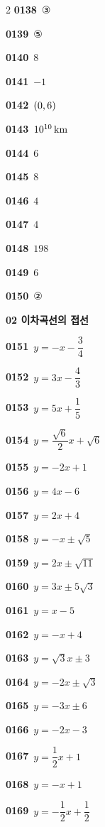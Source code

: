 \documentclass[10pt,a4paper]{article}
\begin{document}
\begin{multicols}{2}
\noindent\textbf{0138}\ ③\par
\noindent\textbf{0139}\ ⑤\par
\noindent\textbf{0140}\ $8$\par
\noindent\textbf{0141}\ $-1$\par
\noindent\textbf{0142}\ $(0{,}\mkern3mu\mathopen{}6)$\par
\noindent\textbf{0143}\ $10^{10}\mkern3mu \mathrm{km}$\par
\noindent\textbf{0144}\ $6$\par
\noindent\textbf{0145}\ $8$\par
\noindent\textbf{0146}\ $4$\par
\noindent\textbf{0147}\ $4$\par
\noindent\textbf{0148}\ $198$\par
\noindent\textbf{0149}\ $6$\par
\noindent\textbf{0150}\ ②\par
\noindent\textbf{02 이차곡선의 접선}\par\smallskip
\noindent\textbf{0151}\ $y=-x-\dfrac{3}{4}$\par
\noindent\textbf{0152}\ $y=3x-\dfrac{4}{3}$\par
\noindent\textbf{0153}\ $y=5x+\dfrac{1}{5}$\par
\noindent\textbf{0154}\ $y=\dfrac{\sqrt{6}}{2}x+\sqrt{6}$\par
\noindent\textbf{0155}\ $y=-2x+1$\par
\noindent\textbf{0156}\ $y=4x-6$\par
\noindent\textbf{0157}\ $y=2x+4$\par
\noindent\textbf{0158}\ $y=-x\pm\sqrt{5}$\par
\noindent\textbf{0159}\ $y=2x\pm\sqrt{11}$\par
\noindent\textbf{0160}\ $y=3x\pm 5\sqrt{3}$\par
\noindent\textbf{0161}\ $y=x-5$\par
\noindent\textbf{0162}\ $y=-x+4$\par
\noindent\textbf{0163}\ $y=\sqrt{3}x\pm 3$\par
\noindent\textbf{0164}\ $y=-2x\pm\sqrt{3}$\par
\noindent\textbf{0165}\ $y=-3x\pm 6$\par
\noindent\textbf{0166}\ $y=-2x-3$\par
\noindent\textbf{0167}\ $y=\dfrac{1}{2}x+1$\par
\noindent\textbf{0168}\ $y=-x+1$\par
\noindent\textbf{0169}\ $y=-\dfrac{1}{2}x+\dfrac{1}{2}$\par

\end{multicols}
\end{document}
